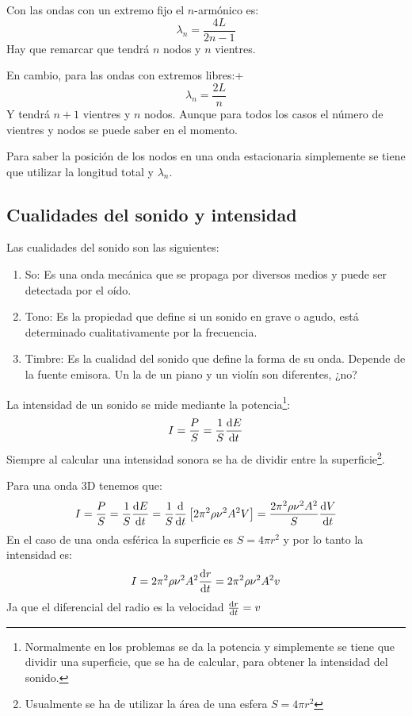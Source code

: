 \documentclass[arial,a4paper,print]{article}
\begin{document}
Con las ondas con un extremo fijo el $n$-armónico es:
\begin{equation*}
	\lambda_{n} = \frac{4L}{2n-1}
\end{equation*}
Hay que remarcar que tendrá $n$ nodos y $n$ vientres.

En cambio, para las ondas con extremos libres:+
\begin{equation*}
	\lambda_{n} = \frac{2L}{n}
\end{equation*}
Y tendrá $n+1$ vientres y $n$ nodos. Aunque para todos los casos el número de vientres y nodos se puede saber en el momento.

Para saber la posición de los nodos en una onda estacionaria simplemente se tiene que utilizar la longitud total y $\lambda_{n}$. 

\subsection{Cualidades del sonido y intensidad}

Las cualidades del sonido son las siguientes:
\begin{enumerate}
	\item So: Es una onda mecánica que se propaga por diversos medios y puede ser detectada por el oído.
	\item Tono: Es la propiedad que define si un sonido en grave o agudo, está determinado cualitativamente por la frecuencia. 
	\item Timbre: Es la cualidad del sonido que define la forma de su onda. Depende de la fuente emisora. Un la de un piano y un violín son diferentes, ¿no?
\end{enumerate}

La intensidad de un sonido se mide mediante la potencia\footnote{Normalmente en los problemas se da la potencia y simplemente se tiene que dividir una superficie, que se ha de calcular, para obtener la intensidad del sonido.}:
\begin{equation*}
	I =\frac PS = \frac 1S \dv{E}{t}
\end{equation*}
Siempre al calcular una intensidad sonora se ha de dividir entre la superficie\footnote{Usualmente se ha de utilizar la área de una esfera $S = 4\pi r^{2}$}.

Para una onda 3D tenemos que:
\begin{equation*}
	I = \frac PS = \frac 1S \dv{E}{t} = \frac 1S\dv{t}\left[2\pi^{2}\rho\nu^{2}A^{2}V\right] = \frac{2\pi^{2}\rho\nu^{2}A^{2}}{S}\dv{V}{t}
\end{equation*}
En el caso de una onda esférica la superficie es $S=4\pi r^{2}$ y por lo tanto la intensidad es:
\begin{equation*}
	I = 2\pi^2\rho\nu^2A^{2}\dv{r}{t} = 2\pi^2\rho\nu^2A^{2}v
\end{equation*} 
Ja que el diferencial del radio es la velocidad $\dv{r}{t} = v$
\end{document}
